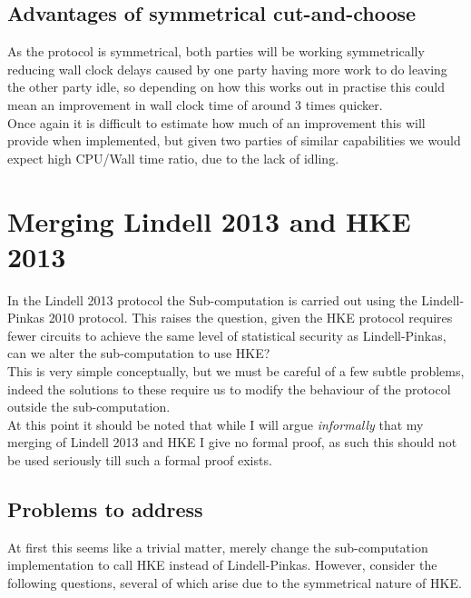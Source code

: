 \documentclass[ %
                    author={Nicholas Tutte},
                supervisor={Prof. Nigel Smart},
                    degree={MEng},
                     title={Secure Two Party Computation},
                  subtitle={A practical comparison of recent protocols},
                      type={Research - GG1K},
                      year={2015} ]{dissertation}
\begin{document}
			\subsection{Advantages of symmetrical cut-and-choose}
				As the protocol is symmetrical, both parties will be working symmetrically reducing wall clock delays caused by one party having more work to do leaving the other party idle, so depending on how this works out in practise this could mean an improvement in wall clock time of around $3$ times quicker.\\

				Once again it is difficult to estimate how much of an improvement this will provide when implemented, but given two parties of similar capabilities we would expect high CPU/Wall time ratio, due to the lack of idling.


		\section{Merging Lindell 2013 and HKE 2013}
			In the Lindell 2013 protocol the Sub-computation is carried out using the Lindell-Pinkas 2010 protocol. This raises the question, given the HKE protocol requires fewer circuits to achieve the same level of statistical security as Lindell-Pinkas, can we alter the sub-computation to use HKE?\\

			This is very simple conceptually, but we must be careful of a few subtle problems, indeed the solutions to these require us to modify the behaviour of the protocol outside the sub-computation.\\

			At this point it should be noted that while I will argue \emph{informally} that my merging of Lindell 2013 and HKE I give no formal proof, as such this should not be used seriously till such a formal proof exists.

			\subsection{Problems to address}
				At first this seems like a trivial matter, merely change the sub-computation implementation to call HKE instead of Lindell-Pinkas. However, consider the following questions, several of which arise due to the symmetrical nature of HKE.
\end{document}
